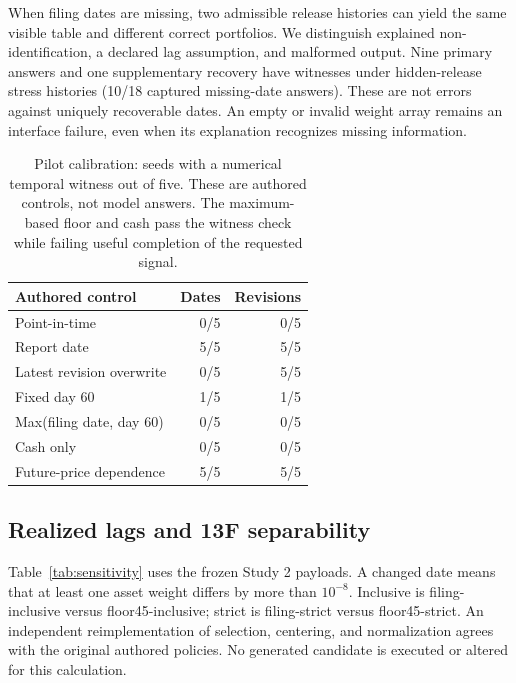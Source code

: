 \documentclass[10pt,twocolumn,a4paper]{article}
\begin{document}
When filing dates are missing, two admissible release histories can yield the same visible table and different correct portfolios. We distinguish explained non-identification, a declared lag assumption, and malformed output. Nine primary answers and one supplementary recovery have witnesses under hidden-release stress histories (10/18 captured missing-date answers). These are not errors against uniquely recoverable dates. An empty or invalid weight array remains an interface failure, even when its explanation recognizes missing information.
\begin{table}[t]
\centering\small
\begin{tabular}{lrr}
\toprule
Authored control & Dates & Revisions\\
\midrule
Point-in-time & 0/5 & 0/5\\
Report date & 5/5 & 5/5\\
Latest revision overwrite & 0/5 & 5/5\\
Fixed day 60 & 1/5 & 1/5\\
Max(filing date, day 60) & 0/5 & 0/5\\
Cash only & 0/5 & 0/5\\
Future-price dependence & 5/5 & 5/5\\
\bottomrule
\end{tabular}
\caption{Pilot calibration: seeds with a numerical temporal witness out of five. These are authored controls, not model answers. The maximum-based floor and cash pass the witness check while failing useful completion of the requested signal.}
\label{tab:controls}
\end{table}\subsection{Realized lags and 13F separability}
\label{app:diagnostics}
Table~\ref{tab:sensitivity} uses the frozen Study 2 payloads. A changed date means that at least one asset weight differs by more than $10^{-8}$. Inclusive is filing-inclusive versus floor45-inclusive; strict is filing-strict versus floor45-strict. An independent reimplementation of selection, centering, and normalization agrees with the original authored policies. No generated candidate is executed or altered for this calculation.
\end{document}
